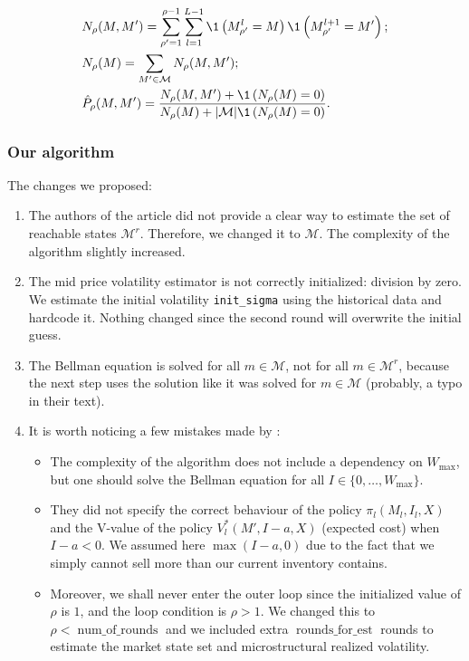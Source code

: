             \begin{align}
                & N_\rho(M, M') = \sum_{\rho' = 1}^{\rho-1} \sum_{l = 1}^{L-1} \1\left(M_{\rho'}^l = M\right) \1\left(M_{\rho'}^{l+1} = M'\right); \label{globe:rule1}\\
                & N_\rho(M) = \sum_{M'\in\mathcal{M}}N_\rho(M, M'); \label{globe:rule2}\\
                & \hat P_\rho(M, M') = \frac{N_\rho(M, M') + \1\left(N_\rho(M) = 0\right)}{N_\rho(M) + |\mathcal M|\1\left(N_\rho(M) = 0\right)}. \label{globe:rule3}
            \end{align}

        \subsubsection{Our algorithm}
            The changes we proposed:
            \begin{enumerate}
                \item The authors of the article did not provide a clear way to estimate the set of reachable states $\mathcal{M}^r$. Therefore, we changed it to $\mathcal{M}$. The complexity of the algorithm slightly increased.
                \item The mid price volatility estimator is not correctly initialized: division by zero. We estimate the initial volatility \texttt{init\_sigma} using the historical data and hardcode it. Nothing changed since the second round will overwrite the initial guess.
                \item The Bellman equation is solved for all $m \in \mathcal M$, not for all $m \in \mathcal M^r$, because the next step uses the solution like it was solved for $m \in \mathcal M$ (probably, a typo in their text).
                \item It is worth noticing a few mistakes made by \citeauthor{Akbarzadeh2018}:
                \begin{itemize}
                    \item The complexity of the algorithm does not include a dependency on $W_{\text{max}}$, but one should solve the Bellman equation for all $I\in \{0, \dots, W_{\text{max}}\}$.
                    \item They did not specify the correct behaviour of the policy $\pi_l(M_l, I_l, X)$ and the V-value of the policy $V^*_l(M', I - a, X)$ (expected cost) when $I-a < 0$. We assumed here $\max(I-a, 0)$ due to the fact that we simply cannot sell more than our current inventory contains.
                    \item Moreover, we shall never enter the outer loop since the initialized value of $\rho$ is $1$, and the loop condition is $\rho > 1$. We changed this to $\rho < \operatorname{num\_of\_rounds}$ and we included extra $\operatorname{rounds\_for\_est}$ rounds to estimate the market state set and microstructural realized volatility. 
                \end{itemize}
            \end{enumerate}

